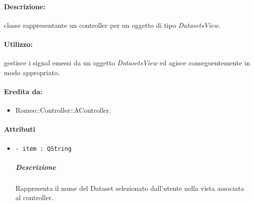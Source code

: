	\paragraph{Descrizione:} classe rappresentante un controller per un oggetto di tipo \textsl{DatasetsView}.
	\paragraph{Utilizzo:} gestisce i signal\g{} emessi da un oggetto \textsl{DatasetsView} ed agisce conseguentemente in modo appropriato.
	\paragraph{Eredita da:}
		\begin{itemize}
			\item Romeo::Controller::AController.
		\end{itemize}
	\paragraph{Attributi}
		\begin{itemize}
			\item \color{teal} \verb!- item : QString!
			\color{black}
			\subparagraph{Descrizione} Rappresenta il nome del Dataset\g{} selezionato dall'utente nella vista associata al controller.
		\end{itemize}
